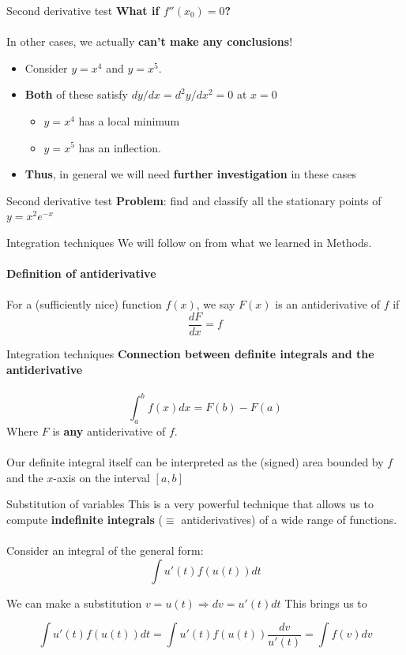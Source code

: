 \documentclass{beamer}
\begin{document}
\begin{frame}{Second derivative test}
	\textbf{What if $f''(x_0) = 0$?}
	\\~\\
	In other cases, we actually \textbf{can't make any conclusions}!
	\begin{itemize}
		\item Consider $y = x^4$ and $y = x^5$.
		\item \textbf{Both} of these satisfy $dy/dx = d^2y/dx^2 = 0$ at $x = 0$
		\begin{itemize}
			\item $y = x^4$ has a local minimum
			\item $y = x^5$ has an inflection.
			
		\end{itemize}
		\item \textbf{Thus}, in general we will need \textbf{further investigation} in these cases
	\end{itemize}	
\end{frame}

\begin{frame}{Second derivative test}
	\textbf{Problem}: find and classify all the stationary points of $y = x^2 e^{-x}$
	\vspace{5cm}
\end{frame}

\begin{frame}{Integration techniques}
	We will follow on from what we learned in Methods.\\~\\
	\textbf{Definition of antiderivative}\\~\\
	For a (sufficiently nice) function $f(x)$, we say $F(x)$ is an antiderivative of $f$ if
	$$\dfrac{dF}{dx} = f$$
\end{frame}

\begin{frame}{Integration techniques}
	\textbf{Connection between definite integrals and the antiderivative}\\~\\
	$$\int_a^b f(x) dx = F(b) - F(a)$$
	Where $F$ is \textbf{any} antiderivative of $f$.\\~\\
	Our definite integral itself can be interpreted as the (signed) area bounded by $f$ and the $x$-axis on the interval $[a, b]$
\end{frame}

\begin{frame}{Substitution of variables}
	This is a very powerful technique that allows us to compute \textbf{indefinite integrals} ($\equiv$ antiderivatives) of a wide range of functions.
	\\~\\
	Consider an integral of the general form:
	$$\int u'(t) f(u(t)) dt$$
	
	We can make a substitution $v = u(t) \Rightarrow dv = u'(t) dt$
	This brings us to
	
	$$\int u'(t) f(u(t)) dt = \int u'(t) f(u(t)) \dfrac{dv}{u'(t)} = \int f(v) dv$$
\end{frame}
\end{document}
